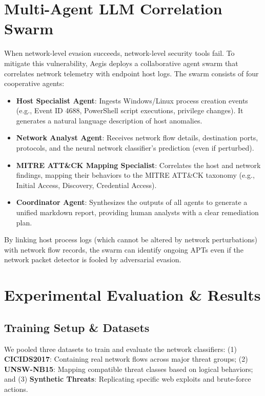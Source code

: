 \documentclass[journal,twoside]{IEEEtran}
\begin{document}
\section{Multi-Agent LLM Correlation Swarm}
\label{sec:swarm}
When network-level evasion succeeds, network-level security tools fail. To mitigate this vulnerability, Aegis deploys a collaborative agent swarm that correlates network telemetry with endpoint host logs. The swarm consists of four cooperative agents:
\begin{itemize}
    \item \textbf{Host Specialist Agent}: Ingests Windows/Linux process creation events (e.g., Event ID 4688, PowerShell script executions, privilege changes). It generates a natural language description of host anomalies.
    \item \textbf{Network Analyst Agent}: Receives network flow details, destination ports, protocols, and the neural network classifier's prediction (even if perturbed).
    \item \textbf{MITRE ATT\&CK Mapping Specialist}: Correlates the host and network findings, mapping their behaviors to the MITRE ATT\&CK taxonomy (e.g., Initial Access, Discovery, Credential Access).
    \item \textbf{Coordinator Agent}: Synthesizes the outputs of all agents to generate a unified markdown report, providing human analysts with a clear remediation plan.
\end{itemize}

By linking host process logs (which cannot be altered by network perturbations) with network flow records, the swarm can identify ongoing APTs even if the network packet detector is fooled by adversarial evasion.

\section{Experimental Evaluation \& Results}
\label{sec:results}

\subsection{Training Setup \& Datasets}
We pooled three datasets to train and evaluate the network classifiers:
(1) \textbf{CICIDS2017}: Containing real network flows across major threat groups;
(2) \textbf{UNSW-NB15}: Mapping compatible threat classes based on logical behaviors; and
(3) \textbf{Synthetic Threats}: Replicating specific web exploits and brute-force actions.
\end{document}
